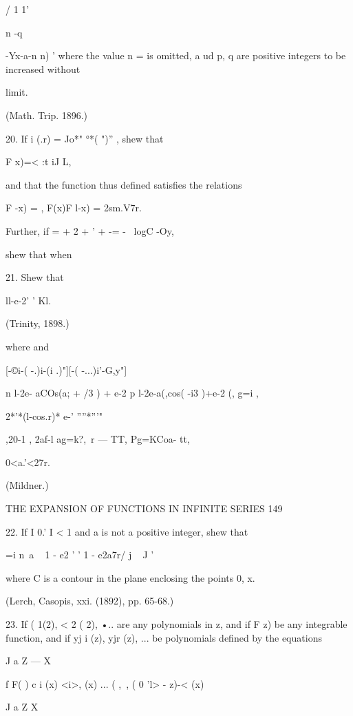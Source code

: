 {{  / 1 1'



n -q \ \ {-Yx-a-n n) ' where the value n = is omitted, a ud p, q are
positive integers to be increased without

limit.

(Math. Trip. 1896.)

20. If i (.r) = Jo*" °*( ")'' , shew that

F x)=< :t iJ L,

and that the function thus defined satisfies the relations

F -x) = , F(x)F l-x) = 2sm.V7r.

Further, if = + 2 + ' + -= - \ logC -Oy,



shew that when

21. Shew that



ll-e-2' ' Kl.



(Trinity, 1898.)



where and



[-©i-( -.)i-(i .)"][-( -...)i'-G,y"]

n l-2e- aCOs(a; + /3 ) + e-2 p l-2e-a(,cos( -i3 )+e-2 (, g=i ,

2*'*(l-cos.r)* e-' ''''*'''"

,20-1 , 2af-l ag=k?,\ r — TT, Pg=KCoa- tt,

0<a.'<27r.



(Mildner.)



THE EXPANSION OF FUNCTIONS IN INFINITE SERIES 149

22. If I 0.' I < 1 and a is not a positive integer, shew that

 =i n~a ~ 1 - e2 ' ' 1 - e2a7r/ j ~ J '

where C is a contour in the plane enclosing the points 0, x.

(Lerch, Casopis, xxi. (1892), pp. 65-68.)

23. If ( 1(2), < 2 ( 2), •.. are any polynomials in z, and if F z) be
any integrable function, and if yj i (z), yjr (z), ... be polynomials
defined by the equations

J a Z — X

f F( ) c i (x) <i>, (x) ... ( ,\ , ( 0 'l> - z)-< (x)

J a Z X

}}}
